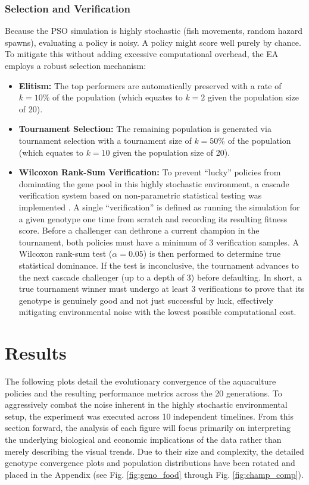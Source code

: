 \documentclass[conference]{IEEEtran}
\begin{document}
\subsubsection{Selection and Verification}
Because the PSO simulation is highly stochastic (fish movements, random hazard spawns), evaluating a policy is noisy. A policy might score well purely by chance. To mitigate this without adding excessive computational overhead, the EA employs a robust selection mechanism:
\begin{itemize}
    \item \textbf{Elitism:} The top performers are automatically preserved with a rate of $k = 10\%$ of the population (which equates to $k = 2$ given the population size of 20).
    \item \textbf{Tournament Selection:} The remaining population is generated via tournament selection with a tournament size of $k = 50\%$ of the population (which equates to $k=10$ given the population size of 20).
    \item \textbf{Wilcoxon Rank-Sum Verification:} To prevent ``lucky'' policies from dominating the gene pool in this highly stochastic environment, a cascade verification system based on non-parametric statistical testing was implemented \cite{wilcoxon_ea}. A single ``verification'' is defined as running the simulation for a given genotype one time from scratch and recording its resulting fitness score. Before a challenger can dethrone a current champion in the tournament, both policies must have a minimum of 3 verification samples. A Wilcoxon rank-sum test ($\alpha = 0.05$) is then performed to determine true statistical dominance. If the test is inconclusive, the tournament advances to the next cascade challenger (up to a depth of 3) before defaulting. In short, a true tournament winner must undergo at least 3 verifications to prove that its genotype is genuinely good and not just successful by luck, effectively mitigating environmental noise with the lowest possible computational cost.
\end{itemize}

\section{Results}

The following plots detail the evolutionary convergence of the aquaculture policies and the resulting performance metrics across the 20 generations. To aggressively combat the noise inherent in the highly stochastic environmental setup, the experiment was executed across 10 independent timelines. From this section forward, the analysis of each figure will focus primarily on interpreting the underlying biological and economic implications of the data rather than merely describing the visual trends. Due to their size and complexity, the detailed genotype convergence plots and population distributions have been rotated and placed in the Appendix (see Fig. \ref{fig:geno_food} through Fig. \ref{fig:champ_comp}).
\end{document}
